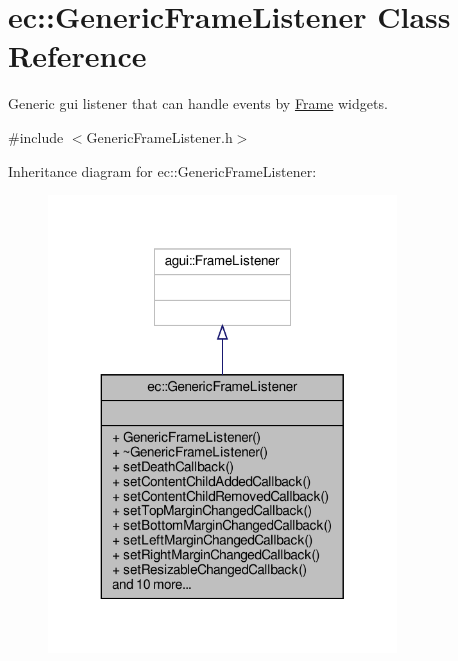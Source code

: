\hypertarget{classec_1_1_generic_frame_listener}{}\section{ec\+:\+:Generic\+Frame\+Listener Class Reference}
\label{classec_1_1_generic_frame_listener}


Generic gui listener that can handle events by \mbox{\hyperlink{classec_1_1_frame}{Frame}} widgets.  




{\ttfamily \#include $<$Generic\+Frame\+Listener.\+h$>$}



Inheritance diagram for ec\+:\+:Generic\+Frame\+Listener\+:\nopagebreak
\begin{figure}[H]
\begin{center}
\leavevmode
\includegraphics[width=262pt]{classec_1_1_generic_frame_listener__inherit__graph}
\end{center}
\end{figure}


